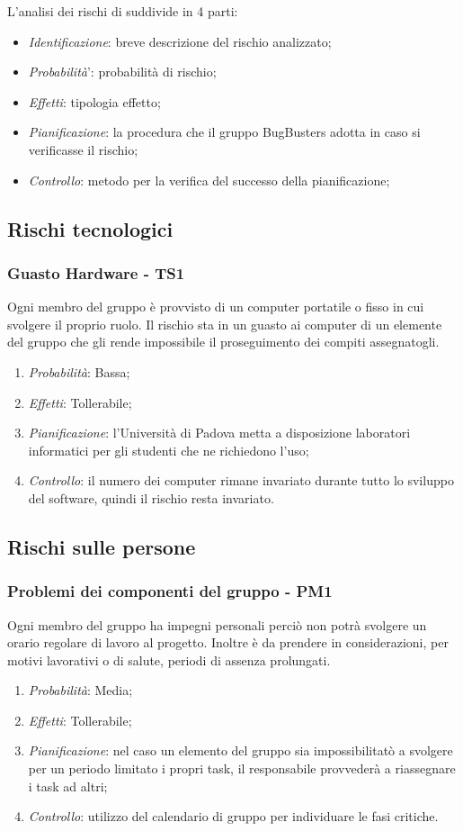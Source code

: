 L'analisi dei rischi di suddivide in 4 parti:
\begin{itemize}
\item \textit{Identificazione}: breve descrizione del rischio analizzato;
\item \textit{Probabilit\`a}': probabilit\`a di rischio;
\item \textit{Effetti}: tipologia effetto;
\item \textit{Pianificazione}: la procedura che il gruppo BugBusters adotta in caso si verificasse il rischio;
\item \textit{Controllo}: metodo per la verifica del successo della pianificazione;
\end{itemize}

\subsection{Rischi tecnologici}
\subsubsection{Guasto Hardware - TS1}
Ogni membro del gruppo \`e provvisto di un computer portatile o fisso in cui svolgere il proprio ruolo. Il rischio sta in un guasto ai computer di un elemente del gruppo che gli rende impossibile il proseguimento dei compiti assegnatogli.
\begin{enumerate}
\item \textit{Probabilit\`a}: Bassa;
\item \textit{Effetti}: Tollerabile; 
\item \textit{Pianificazione}: l'Universit\`a di Padova metta a disposizione laboratori informatici per gli studenti che ne richiedono l'uso;
\item \textit{Controllo}: il numero dei computer rimane invariato durante tutto lo sviluppo del software, quindi il rischio resta invariato.
\end{enumerate}

\subsection{Rischi sulle persone}
\subsubsection{Problemi dei componenti del gruppo - PM1}
Ogni membro del gruppo ha impegni personali perci\`o non potr\`a svolgere un orario regolare di lavoro al progetto. Inoltre \`e da prendere in considerazioni, per motivi lavorativi o di salute, periodi di assenza prolungati.
\begin{enumerate}
\item \textit{Probabilit\`a}: Media;
\item \textit{Effetti}: Tollerabile;
\item \textit{Pianificazione}: nel caso un elemento del gruppo sia impossibilitat\`o a svolgere per un periodo limitato i propri task, il responsabile provveder\`a a riassegnare i task ad altri;
\item \textit{Controllo}: utilizzo del calendario di gruppo per individuare le fasi critiche.
\end{enumerate}

